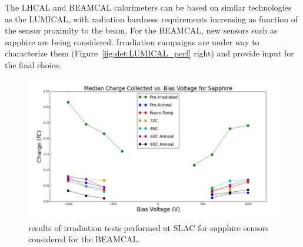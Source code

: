 The LHCAL and BEAMCAL calorimeters can be based on similar technologies as the LUMICAL, with radiation hardness requirements increasing as function of the sensor proximity to the beam. For the BEAMCAL, new sensors such as sapphire are being considered. Irradiation campaigns are under way to characterize them (Figure~\ref{fig:det:LUMICAL_perf} right) and provide input for the final choice. 

\begin{figure}[t!]
\centering
\includegraphics[width=0.8\hsize]{Detector/fig/BEAMCAL_rad.jpg}
\caption{results of irradiation tests performed at SLAC for sapphire sensors considered for the BEAMCAL.}
\label{fig:det:BEAMCAL_rad}
\end{figure}

\vspace{2.0cm}